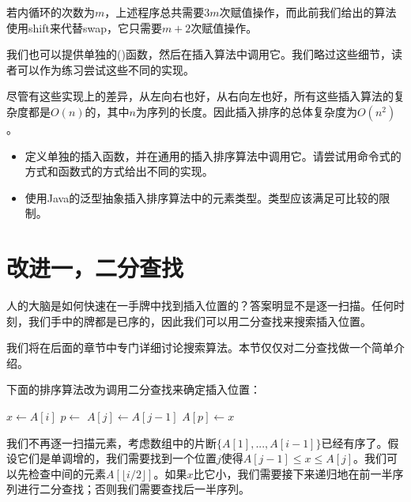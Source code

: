 \documentclass[UTF8]{article}
\begin{document}
若内循环的次数为$m$，上述程序总共需要$3m$次赋值操作，而此前我们给出的算法使用shift来代替swap，它只需要$m+2$次赋值操作。

我们也可以提供单独的()函数，然后在插入算法中调用它。我们略过这些细节，读者可以作为练习尝试这些不同的实现。

尽管有这些实现上的差异，从左向右也好，从右向左也好，所有这些插入算法的复杂度都是$O(n)$的，其中$n$为序列的长度。因此插入排序的总体复杂度为$O(n^2)$。

\begin{Exercise}

\begin{itemize}
\item 定义单独的插入函数，并在通用的插入排序算法中调用它。请尝试用命令式的方式和函数式的方式给出不同的实现。
\item 使用Java的泛型抽象插入排序算法中的元素类型。类型应该满足可比较的限制。
\end{itemize}

\end{Exercise}


\section{改进一，二分查找}

人的大脑是如何快速在一手牌中找到插入位置的？答案明显不是逐一扫描。任何时刻，我们手中的牌都是已序的，因此我们可以用二分查找来搜索插入位置。

我们将在后面的章节中专门详细讨论搜索算法。本节仅仅对二分查找做一个简单介绍。

下面的排序算法改为调用二分查找来确定插入位置：

\begin{algorithmic}[1]
    \State $x \gets A[i]$
    \State $p \gets $ 
      \State $A[j] \gets A[j-1]$
    \EndFor
    \State $A[p] \gets x$
  \EndFor
\EndFunction
\end{algorithmic}

我们不再逐一扫描元素，考虑数组中的片断$\{A[1], ..., A[i-1] \}$已经有序了。假设它们是单调增的，我们需要找到一个位置$j$使得$A[j-1] \leq x \leq A[j]$。我们可以先检查中间的元素$A[\lfloor i/2 \rfloor]$。如果$x$比它小，我们需要接下来递归地在前一半序列进行二分查找；否则我们需要查找后一半序列。
\end{document}
